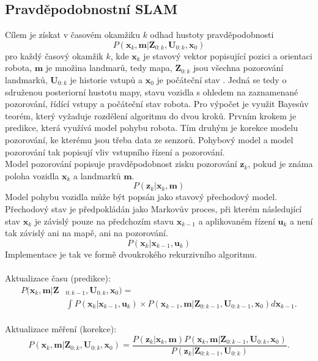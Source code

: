 \documentclass[12pt]{report}
\begin{document}
\subsection{Pravděpodobnostní SLAM}
Cílem je získat v časovém okamžiku $k$ odhad hustoty pravděpodobnosti
\begin{equation}
	P(\textbf{x}_k,\textbf{m}|\textbf{Z}_{0:k},\textbf{U}_{0:k},\textbf{x}_0)
\end{equation}
pro každý časový okamžik ${k}$, kde $\textbf{x}_k$ je stavový vektor popisující pozici a orientaci robota, $\textbf{m}$ je množina landmarů, tedy mapa, $\textbf{Z}_{0:k}$ jsou všechna pozorování landmarků, $\textbf{U}_{0:k}$ je historie vstupů a $\textbf{x}_0$ je počáteční stav \cite{Durrant-Whyte2006}. Jedná se tedy o sdruženou posteriorní hustotu mapy, stavu vozidla s ohledem na zaznamenané pozorování, řídící vstupy a  počáteční stav robota. Pro výpočet je využit Bayesův teorém, který vyžaduje rozdělení algoritmu do dvou kroků. Prvním krokem je predikce, která využívá model pohybu robota. Tím druhým je korekce modelu pozorování, ke kterému jsou třeba data ze senzorů. Pohybový model a model pozorování tak popisují vliv vstupního řízení a pozorování.\\
\indent Model pozorování popisuje pravděpodobnost zisku pozorování $\textbf{z}_k$, pokud je známa poloha vozidla $\textbf{x}_k$ a landmarků $\textbf{m}$.
\begin{equation}
	P(\textbf{z}_k|\textbf{x}_k,\textbf{m})
\end{equation} 
\indent Model pohybu vozidla může být popsán jako stavový přechodový model. \\Přechodový stav je předpokládán jako Markovův proces, při kterém následující stav $\textbf{x}_k$ je závislý pouze na předchozím stavu $\textbf{x}_{k-1}$ a aplikovaném řízení $\textbf{u}_k$ a není tak závislý ani na mapě, ani na pozorování.
\begin{equation}
	P(\textbf{x}_k|\textbf{x}_{k-1},\textbf{u}_k)
\end{equation}
Implementace je tak ve formě dvoukrokého rekurzivního algoritmu.\\
\\
Aktualizace času (predikce):
\begin{equation}
	\begin{split}
	P(\textbf{x}_k,\textbf{m}|\textbf{Z}&_{0:k-1},\textbf{U}_{0:k},\textbf{x}_0)=\\&\int P(\textbf{x}_k|\textbf{x}_{k-1},\textbf{u}_k)\times P(\textbf{x}_{k-1},\textbf{m}|\textbf{Z}_{0:k-1},\textbf{U}_{0:k-1},\textbf{x}_0)d\textbf{x}_{k-1}.
	\end{split}
\end{equation}
\\
Aktualizace měření (korekce):
\begin{equation}
	P(\textbf{x}_k,\textbf{m}|\textbf{Z}_{0:k},\textbf{U}_{0:k},\textbf{x}_0)=\frac{P(\textbf{z}_k|\textbf{x}_k,\textbf{m})P(\textbf{x}_k,\textbf{m}|\textbf{Z}_{0:k-1},\textbf{U}_{0:k},\textbf{x}_0)}{P(\textbf{z}_k|\textbf{Z}_{0:k-1},\textbf{U}_{0:k})}.
\end{equation}
\end{document}
